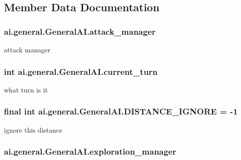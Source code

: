 \subsection{Member Data Documentation}
\hypertarget{classai_1_1general_1_1_general_a_i_a286b49649938c2d88dbe8705dac959ff}{
\subsubsection[{attack\_\-manager}]{ {\bf ai.general.GeneralAI.attack\_\-manager}}}
\label{classai_1_1general_1_1_general_a_i_a286b49649938c2d88dbe8705dac959ff}
attack manager \hypertarget{classai_1_1general_1_1_general_a_i_a53826321184783f1d220fd72be9a470c}{
\subsubsection[{current\_\-turn}]{\setlength{\rightskip}{0pt plus 5cm}int {\bf ai.general.GeneralAI.current\_\-turn}}}
\label{classai_1_1general_1_1_general_a_i_a53826321184783f1d220fd72be9a470c}
what turn is it \hypertarget{classai_1_1general_1_1_general_a_i_a84cf0b772ef876f73b5379edc5de4120}{
\subsubsection[{DISTANCE\_\-IGNORE}]{\setlength{\rightskip}{0pt plus 5cm}final int {\bf ai.general.GeneralAI.DISTANCE\_\-IGNORE} = -\/1}}
\label{classai_1_1general_1_1_general_a_i_a84cf0b772ef876f73b5379edc5de4120}
ignore this distance \hypertarget{classai_1_1general_1_1_general_a_i_acd7fe2fea4dd83aa8d17f6ba6120700a}{
\subsubsection[{exploration\_\-manager}]{ {\bf ai.general.GeneralAI.exploration\_\-manager}}}
